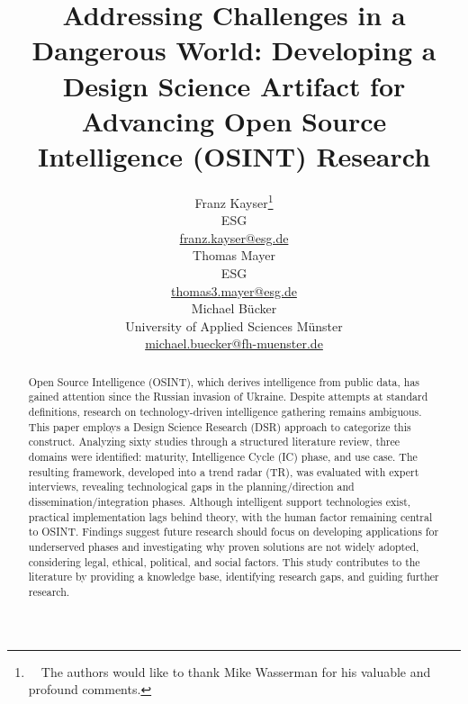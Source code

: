 \documentclass[10pt]{article}
\title{Addressing Challenges in a Dangerous World: Developing a Design Science Artifact for Advancing Open Source Intelligence (OSINT) Research}
\author{Franz Kayser\thanks{~~The authors would like to thank Mike Wasserman for his valuable and profound comments.} \\
 ESG \\
 {\underline{ franz.kayser@esg.de}} \\\And
 Thomas Mayer \\
 ESG  \\
 {\underline{ thomas3.mayer@esg.de} }\\\And 
 Michael Bücker \\
University of Applied Sciences Münster\\
 {\underline{michael.buecker@fh-muenster.de}} \\}
\date{}
\begin{document}
\maketitle
\begin{abstract}
    Open Source Intelligence (OSINT), which derives intelligence from public data, has gained attention since the Russian invasion of Ukraine. Despite attempts at standard definitions, research on technology-driven intelligence gathering remains ambiguous. This paper employs a Design Science Research (DSR) approach to categorize this construct. Analyzing sixty studies through a structured literature review, three domains were identified: maturity, Intelligence Cycle (IC) phase, and use case. The resulting framework, developed into a trend radar (TR), was evaluated with expert interviews, revealing technological gaps in the planning/direction and dissemination/integration phases. Although intelligent support technologies exist, practical implementation lags behind theory, with the human factor remaining central to OSINT. Findings suggest future research should focus on developing applications for underserved phases and investigating why proven solutions are not widely adopted, considering legal, ethical, political, and social factors. This study contributes to the literature by providing a knowledge base, identifying research gaps, and guiding further research.
\end{abstract}
\end{document}
